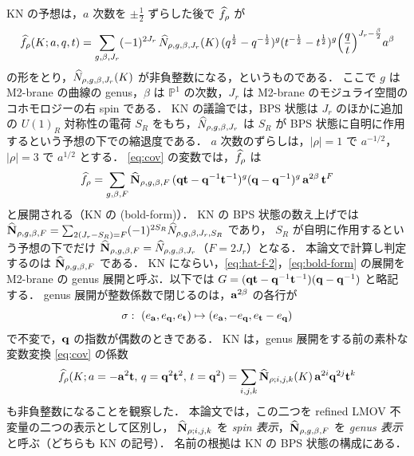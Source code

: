 KN の予想は，$a$ 次数を $\pm\frac12$ ずらした後で $\widehat f_\rho$ が
\begin{equation}\label{eq:hat-f-2}
\widehat f_\rho(K;a,q,t)=\sum_{g,\beta,J_r}(-1)^{2J_r}\,\widehat N_{\rho,g,\beta,J_r}(K)\,(q^{\frac12}-q^{-\frac12})^{g}(t^{-\frac12}-t^{\frac12})^{g}\Bigl(\frac qt\Bigr)^{J_r-\frac\beta2}a^{\beta}
\end{equation}
の形をとり，$\widehat N_{\rho,g,\beta,J_r}(K)$ が非負整数になる，というものである．
ここで $g$ は M2-brane の曲線の genus，$\beta$ は $\mathbb P^1$ の次数，$J_r$ は M2-brane のモジュライ空間のコホモロジーの右 spin である．
KN の議論では，BPS 状態は $J_r$ のほかに追加の $U(1)_R$ 対称性の電荷 $S_R$ をもち，$\widehat N_{\rho,g,\beta,J_r}$ は $S_R$ が BPS 状態に自明に作用するという予想の下での縮退度である．
$a$ 次数のずらしは，$|\rho|=1$ で $a^{-1/2}$，$|\rho|=3$ で $a^{1/2}$ とする．
\eqref{eq:cov} の変数では，$\widehat f_\rho$ は
\begin{equation}\label{eq:bold-form}
\widehat f_\rho=\sum_{g,\beta,F}\widehat{\mathbf N}_{\rho,g,\beta,F}\,(\mathbf{q}\mathbf{t}-\mathbf{q}^{-1}\mathbf{t}^{-1})^{g}(\mathbf{q}-\mathbf{q}^{-1})^{g}\,\mathbf{a}^{2\beta}\,\mathbf{t}^{F}
\end{equation}
と展開される（KN の (bold-form)）．
KN の BPS 状態の数え上げでは $\widehat{\mathbf N}_{\rho,g,\beta,F}=\sum_{2(J_r-S_R)=F}(-1)^{2S_R}\widehat N_{\rho,g,\beta,J_r,S_R}$ であり，
$S_R$ が自明に作用するという予想の下でだけ $\widehat{\mathbf N}_{\rho,g,\beta,F}=\widehat N_{\rho,g,\beta,J_r}$（$F=2J_r$）となる．
本論文で計算し判定するのは $\widehat{\mathbf N}_{\rho,g,\beta,F}$ である．
KN にならい，\eqref{eq:hat-f-2}，\eqref{eq:bold-form} の展開を M2-brane の genus 展開と呼ぶ．以下では $G=(\mathbf{q}\mathbf{t}-\mathbf{q}^{-1}\mathbf{t}^{-1})(\mathbf{q}-\mathbf{q}^{-1})$ と略記する．
genus 展開が整数係数で閉じるのは，$\mathbf{a}^{2\beta}$ の各行が
\begin{equation}\label{eq:sigma}
\sigma:\ (e_{\mathbf{a}},e_{\mathbf{q}},e_{\mathbf{t}})\mapsto(e_{\mathbf{a}},-e_{\mathbf{q}},e_{\mathbf{t}}-e_{\mathbf{q}})
\end{equation}
で不変で，$\mathbf{q}$ の指数が偶数のときである．
KN は，genus 展開をする前の素朴な変数変換 \eqref{eq:cov} の係数
\[
\widehat f_\rho(K;a=-\mathbf{a}^2\mathbf{t},\,q=\mathbf{q}^2\mathbf{t}^2,\,t=\mathbf{q}^2)=\sum_{i,j,k}\widehat{\mathbf N}_{\rho;i,j,k}(K)\,\mathbf{a}^{2i}\mathbf{q}^{2j}\mathbf{t}^{k}
\]
も非負整数になることを観察した．
本論文では，この二つを refined LMOV 不変量の二つの表示として区別し，
$\widehat{\mathbf N}_{\rho;i,j,k}$ を \emph{spin 表示}，$\widehat{\mathbf N}_{\rho,g,\beta,F}$ を \emph{genus 表示} と呼ぶ（どちらも KN の記号）．
名前の根拠は KN の BPS 状態の構成にある．
